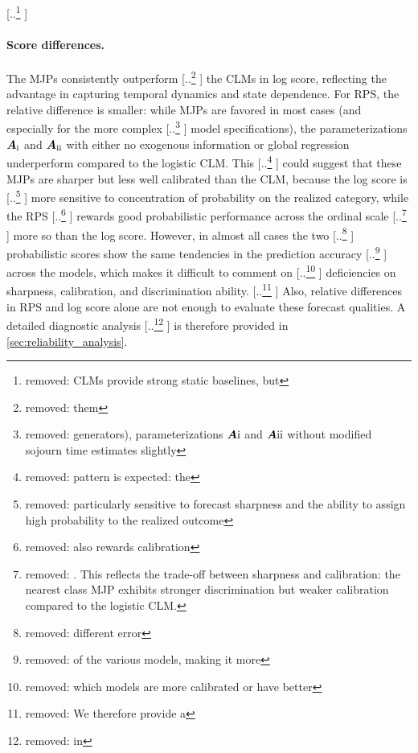 \documentclass{article}
\newcommand{\RN}[1]{\textup{\uppercase\expandafter{\romannumeral#1}}}
\providecommand{\DIFadd}[1]{{\protect\color{blue} \sf #1}} %
\providecommand{\DIFdel}[1]{{\protect\color{red} [..\footnote{removed: #1} ]}} %
\providecommand{\DIFaddbegin}{} %
\providecommand{\DIFaddend}{} %
\providecommand{\DIFdelbegin}{} %
\providecommand{\DIFdelend}{} %
\begin{document}
\DIFdelbegin \DIFdel{CLMs provide strong static baselines, but }\DIFdelend \DIFaddbegin \paragraph{\DIFadd{Score differences.}}
\DIFadd{The }\DIFaddend MJPs consistently outperform \DIFdelbegin \DIFdel{them }\DIFdelend \DIFaddbegin \DIFadd{the CLMs }\DIFaddend in log score, reflecting the advantage in capturing temporal dynamics and state dependence. For RPS, the relative difference is smaller: while MJPs are favored in most cases (and especially for the more complex \DIFdelbegin \DIFdel{generators), parameterizations $\bm{A}{\RN{1}}$ and $\bm{A}{\RN{2}}$ without modified sojourn time estimates slightly }\DIFdelend \DIFaddbegin \DIFadd{model specifications), the parameterizations $\bm{A}_{\RN{1}}$ and $\bm{A}_{\RN{2}}$ with either no exogenous information or global regression }\DIFaddend underperform compared to the logistic CLM. This \DIFdelbegin \DIFdel{pattern is expected: the }\DIFdelend \DIFaddbegin \DIFadd{could suggest that these MJPs are sharper but less well calibrated than the CLM, because the }\DIFaddend log score is \DIFdelbegin \DIFdel{particularly sensitive to forecast sharpness and the ability to assign high probability to the realized outcome}\DIFdelend \DIFaddbegin \DIFadd{more sensitive to concentration of probability on the realized category}\DIFaddend , while the RPS \DIFdelbegin \DIFdel{also rewards calibration }\DIFdelend \DIFaddbegin \DIFadd{rewards good probabilistic performance }\DIFaddend across the ordinal scale \DIFdelbegin \DIFdel{. 
This reflects the trade-off between sharpness and calibration: the nearest class MJP exhibits stronger discrimination but weaker calibration compared to the logistic CLM.
}\DIFdelend \DIFaddbegin \DIFadd{more so than the log score.
}\DIFaddend However, in almost all cases the two \DIFdelbegin \DIFdel{different error }\DIFdelend \DIFaddbegin \DIFadd{probabilistic }\DIFaddend scores show the same tendencies in the prediction accuracy \DIFdelbegin \DIFdel{of the various models, making it more }\DIFdelend \DIFaddbegin \DIFadd{across the models, which makes it }\DIFaddend difficult to comment on \DIFdelbegin \DIFdel{which models are more calibrated or have better }\DIFdelend \DIFaddbegin \DIFadd{deficiencies on sharpness, calibration, and }\DIFaddend discrimination ability. \DIFdelbegin \DIFdel{We therefore provide a }\DIFdelend \DIFaddbegin \DIFadd{Also, relative differences in RPS and log score alone are not enough to evaluate these forecast qualities. A }\DIFaddend detailed diagnostic analysis \DIFdelbegin \DIFdel{in }\DIFdelend \DIFaddbegin \DIFadd{is therefore provided in \cref{sec:reliability_analysis}}\DIFaddend .
\end{document}
